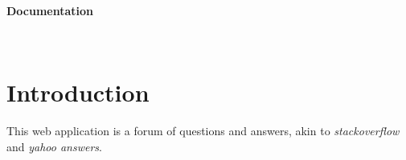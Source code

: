 \documentclass[a4paper,12pt]{article}
\begin{document}
\centerline{\huge \textbf{Documentation}} \hspace*{\fill}
\\
\tableofcontents
\section{Introduction}
This web application is a forum of questions and answers, akin to \emph{stackoverflow} and \emph{yahoo answers}.
\end{document}
